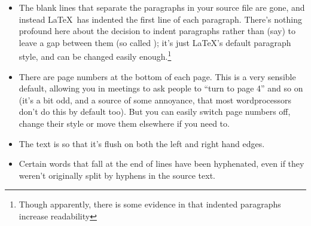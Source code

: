 \begin{refsection}

\begin{itemize}
\item The blank lines that separate the paragraphs in your source file are gone, and instead \LaTeX\ has indented the first line of each paragraph. There's nothing profound here about the decision to indent paragraphs rather than (say) to leave a gap between them (so called ); it's just \LaTeX's default paragraph style, and can be changed easily enough.\footnote{Though apparently, there is some evidence in \cite{tinker63} that indented paragraphs increase readability}
\item There are page numbers at the bottom of each page. This is a very sensible default, allowing you in meetings to ask people to ``turn to page 4'' and so on (it's a bit odd, and a source of some annoyance, that most wordprocessors don't do this by default too). But you can easily switch page numbers off, change their style or move them elsewhere if you need to. 
\item The text is  so that it's flush on both the left and right hand edges.
\item Certain words that fall at the end of lines have been hyphenated, even if they weren't originally split by hyphens in the source text.
\end{itemize}


\end{refsection}

